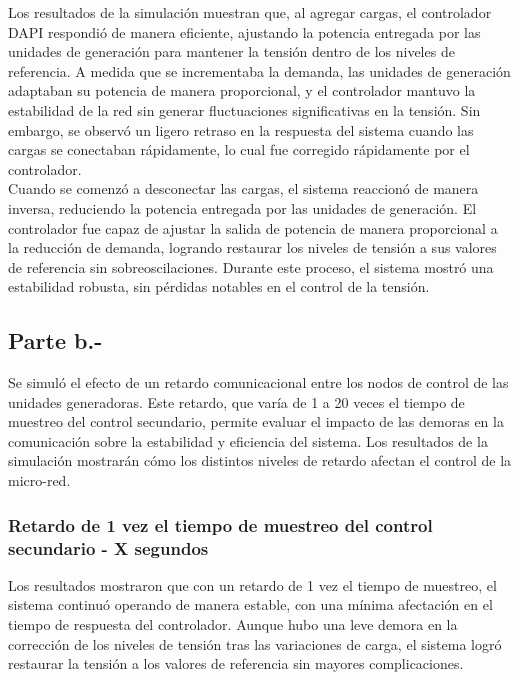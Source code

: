 
Los resultados de la simulación muestran que, al agregar cargas, el controlador DAPI respondió de manera eficiente, ajustando la potencia entregada por las unidades de generación para mantener la tensión dentro de los niveles de referencia. A medida que se incrementaba la demanda, las unidades de generación adaptaban su potencia de manera proporcional, y el controlador mantuvo la estabilidad de la red sin generar fluctuaciones significativas en la tensión. Sin embargo, se observó un ligero retraso en la respuesta del sistema cuando las cargas se conectaban rápidamente, lo cual fue corregido rápidamente por el controlador.\\

Cuando se comenzó a desconectar las cargas, el sistema reaccionó de manera inversa, reduciendo la potencia entregada por las unidades de generación. El controlador fue capaz de ajustar la salida de potencia de manera proporcional a la reducción de demanda, logrando restaurar los niveles de tensión a sus valores de referencia sin sobreoscilaciones. Durante este proceso, el sistema mostró una estabilidad robusta, sin pérdidas notables en el control de la tensión.

\subsection{Parte b.-}

Se simuló el efecto de un retardo comunicacional entre los nodos de control de las unidades generadoras. Este retardo, que varía de 1 a 20 veces el tiempo de muestreo del control secundario, permite evaluar el impacto de las demoras en la comunicación sobre la estabilidad y eficiencia del sistema. Los resultados de la simulación mostrarán cómo los distintos niveles de retardo afectan el control de la micro-red.

\subsubsection{Retardo de 1 vez el tiempo de muestreo del control secundario - X segundos}


Los resultados mostraron que con un retardo de 1 vez el tiempo de muestreo, el sistema continuó operando de manera estable, con una mínima afectación en el tiempo de respuesta del controlador. Aunque hubo una leve demora en la corrección de los niveles de tensión tras las variaciones de carga, el sistema logró restaurar la tensión a los valores de referencia sin mayores complicaciones.

